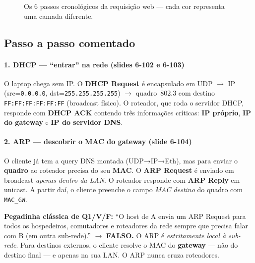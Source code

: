 \documentclass[11pt,a4paper]{article}
\begin{document}
\begin{figure}[h!]
{
}
\caption{Os 6 passos cronológicos da requisição web --- cada cor representa uma camada diferente.}
\label{fig:seq67}
\end{figure}

\subsection{Passo a passo comentado}

\paragraph{1. DHCP --- ``entrar'' na rede (slides 6-102 e 6-103)}

O laptop chega sem IP. O \textbf{DHCP Request} é encapsulado em UDP $\to$ IP (src=\texttt{0.0.0.0}, dst=\texttt{255.255.255.255}) $\to$ quadro~802.3 com destino \texttt{FF:FF:FF:FF:FF:FF} (broadcast físico). O roteador, que roda o servidor DHCP, responde com \textbf{DHCP ACK} contendo três informações críticas: \textbf{IP próprio}, \textbf{IP do gateway} e \textbf{IP do servidor DNS}.

\paragraph{2. ARP --- descobrir o MAC do gateway (slide 6-104)}

O cliente já tem a query DNS montada (UDP→IP→Eth), mas para enviar o \textbf{quadro} ao roteador precisa do seu \textbf{MAC}. O \textbf{ARP Request} é enviado em broadcast \emph{apenas dentro da LAN}. O roteador responde com \textbf{ARP Reply} em unicast. A partir daí, o cliente preenche o campo \textit{MAC destino} do quadro com \texttt{MAC\_GW}.

\begin{nota}
\textbf{Pegadinha clássica de Q1/V/F:} ``O host de A envia um ARP Request para todos os hospedeiros, comutadores e roteadores da rede sempre que precisa falar com B (em outra sub-rede).'' $\to$ \textbf{FALSO.} O ARP é \emph{estritamente local à sub-rede}. Para destinos externos, o cliente resolve o MAC do \textbf{gateway} --- não do destino final --- e apenas na sua LAN. O ARP nunca cruza roteadores.
\end{nota}
\end{document}
